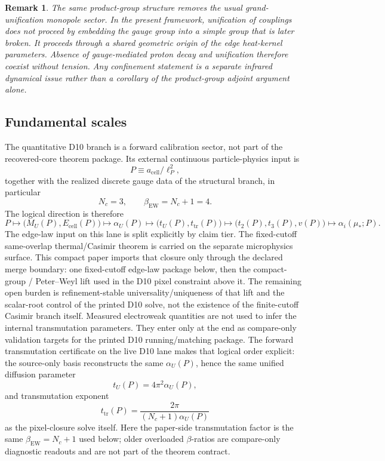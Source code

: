 \documentclass[11pt]{article}
\newtheorem{remark}[theorem]{Remark}
\begin{document}
\begin{remark}
The same product-group structure removes the usual grand-unification monopole sector. In the present framework, unification of couplings does not proceed by embedding the gauge group into a simple group that is later broken. It proceeds through a shared geometric origin of the edge heat-kernel parameters. Absence of gauge-mediated proton decay and unification therefore coexist without tension. Any confinement statement is a separate infrared dynamical issue rather than a corollary of the product-group adjoint argument alone.
\end{remark}

\subsection{Fundamental scales}

The quantitative D10 branch is a forward calibration sector, not part of the recovered-core theorem package. Its external continuous particle-physics input is
\[
P \equiv a_{\mathrm{cell}}/\ell_P^2,
\]
together with the realized discrete gauge data of the structural branch, in particular
\[
N_c=3,
\qquad
\beta_{\mathrm{EW}}=N_c+1=4.
\]
The logical direction is therefore
\[
P
\longmapsto
\bigl(M_U(P),E_{\mathrm{cell}}(P)\bigr)
\longmapsto
\alpha_U(P)
\longmapsto
\bigl(t_U(P),t_{\mathrm{tr}}(P)\bigr)
\longmapsto
\bigl(t_2(P),t_3(P),v(P)\bigr)
\longmapsto
\alpha_i(\mu_\ast;P).
\]
The edge-law input on this lane is split explicitly by claim tier. The fixed-cutoff
same-overlap thermal/Casimir theorem is carried on the separate microphysics surface. This
compact paper imports that closure only through the declared merge boundary: one fixed-cutoff
edge-law package below, then the compact-group / Peter--Weyl lift used in the D10 pixel
constraint above it. The remaining open burden is refinement-stable universality/uniqueness of
that lift and the scalar-root control of the printed D10 solve, not the existence of the
finite-cutoff Casimir branch itself.
Measured electroweak quantities are not used to infer the internal transmutation parameters. They enter only at the end as compare-only validation targets for the printed D10 running/matching package.
The forward transmutation certificate on the live D10 lane makes that logical order explicit: the source-only basis reconstructs the same \(\alpha_U(P)\), hence the same unified diffusion parameter
\[
t_U(P)=4\pi^2\alpha_U(P),
\]
and transmutation exponent
\[
t_{\mathrm{tr}}(P)=\frac{2\pi}{(N_c+1)\alpha_U(P)}
\]
as the pixel-closure solve itself. Here the paper-side transmutation factor is the same
\(\beta_{\mathrm{EW}}=N_c+1\) used below; older overloaded \(\beta\)-ratios are compare-only
diagnostic readouts and are not part of the theorem contract.
\end{document}
